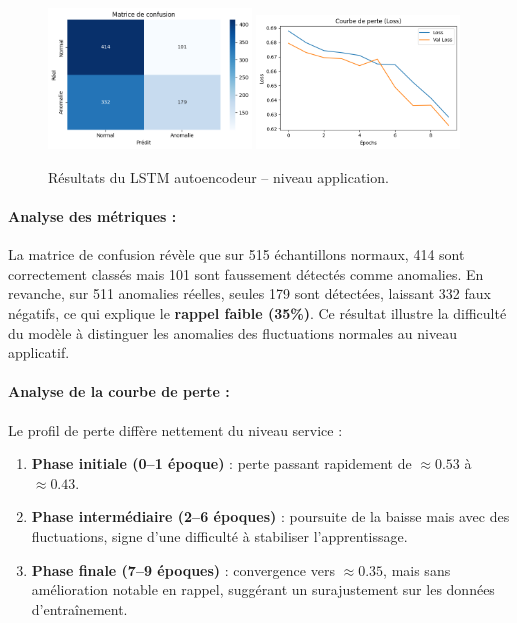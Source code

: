 \documentclass[a4paper,12pt]{report}
\begin{document}
\begin{figure}[H]
    \centering
    \includegraphics[width=0.48\textwidth]{images/confusion_matrix_lstm_application.png}
    \includegraphics[width=0.48\textwidth]{images/loss_curve_lstm_application.png}
    \caption{Résultats du LSTM autoencodeur – niveau application.}
\end{figure}

\paragraph{Analyse des métriques :}
La matrice de confusion révèle que sur 515 échantillons normaux, 414 sont correctement classés mais 101 sont faussement détectés comme anomalies.  
En revanche, sur 511 anomalies réelles, seules 179 sont détectées, laissant 332 faux négatifs, ce qui explique le \textbf{rappel faible (35\%)}.  
Ce résultat illustre la difficulté du modèle à distinguer les anomalies des fluctuations normales au niveau applicatif.

\paragraph{Analyse de la courbe de perte :}
Le profil de perte diffère nettement du niveau service :
\begin{enumerate}
    \item \textbf{Phase initiale (0--1 époque)} : perte passant rapidement de $\approx 0.53$ à $\approx 0.43$.
    \item \textbf{Phase intermédiaire (2--6 époques)} : poursuite de la baisse mais avec des fluctuations, signe d’une difficulté à stabiliser l’apprentissage.
    \item \textbf{Phase finale (7--9 époques)} : convergence vers $\approx 0.35$, mais sans amélioration notable en rappel, suggérant un surajustement sur les données d’entraînement.
\end{enumerate}
\end{document}
